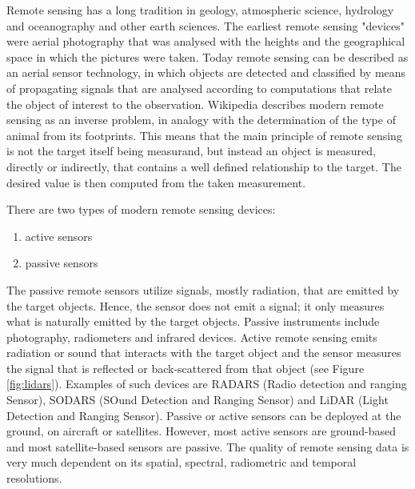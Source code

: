 Remote sensing has a long tradition in geology, atmospheric science, hydrology and oceanography and other earth sciences. The earliest remote sensing "devices" were aerial photography that was analysed with the heights and the geographical space in which the pictures were taken. 
Today remote sensing can be described as an aerial sensor technology, in which objects are detected and classified by means of propagating signals that are analysed according to computations that relate the object of interest to the observation. Wikipedia \cite{Wiki2016} describes modern remote sensing as an inverse problem, in analogy with the determination of the type of animal from its footprints. 
This means that the main principle of remote sensing is not the target itself being measurand, but instead an object is measured, directly or indirectly, that contains a well defined relationship to the target. The desired value is then computed from the taken measurement.

There are two types of modern remote sensing devices: 
\begin{enumerate}
    \vspace{-0.2cm}\item active sensors
    \vspace{-0.2cm}\item passive sensors
\end{enumerate} 

The passive remote sensors utilize signals, mostly radiation, that are emitted by the target objects.  Hence, the sensor does not emit a signal; it only measures what is naturally emitted by the target objects.  Passive instruments include photography, radiometers and infrared devices. Active remote sensing emits radiation or sound that interacts with the target object and the sensor measures the signal that is reflected or back-scattered from that object (see Figure \ref{fig:lidars}). Examples of such devices are RADARS (Radio detection and ranging Sensor), SODARS (SOund Detection and Ranging Sensor) and LiDAR (Light Detection and Ranging Sensor). Passive or active sensors can be deployed at the ground, on aircraft or satellites.  However, most active sensors are ground-based and most satellite-based sensors are passive.  The quality of remote sensing data is very much dependent on its spatial, spectral, radiometric and temporal resolutions. 


